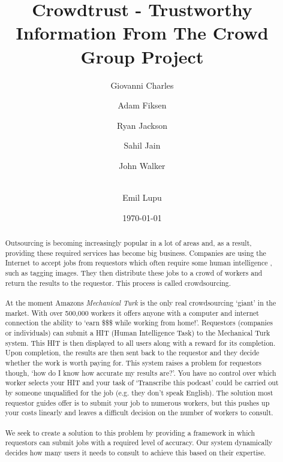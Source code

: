 \documentclass[11pt]{article}
\begin{document}
\title{Crowdtrust - Trustworthy Information From The Crowd\\ Group Project }

\author{Giovanni Charles \and Adam Fiksen \and Ryan Jackson \and Sahil Jain \and John Walker \and \\ Emil Lupu}

\date{\today}         %

\maketitle           %
\newpage


\begin{abstract}
\noindent Outsourcing is becoming increasingly popular in a lot of areas and, as a result, providing these required services has 
become big business. Companies are using the Internet to accept jobs from requestors which often require some human intelligence ,
such as tagging images. They then distribute these jobs to a crowd of workers and return the results to the requestor. This process is called
crowdsourcing. %
\\
\\
\noindent At the moment Amazons \emph{Mechanical Turk} is the only real crowdsourcing `giant' in the market. With over 500,000 workers it offers
anyone with a computer and internet connection the ability to `earn \$\$\$ while working from home!'. Requestors (companies or individuals) 
can submit a HIT (Human Intelligence Task) to the Mechanical Turk system. This HIT is then displayed to all users along with a 
reward for its completion. Upon completion, the results are then sent back to the requestor and they decide whether the work is worth paying for. 
This system raises a problem for requestors though, `how do I know how accurate my results are?'. You have no control over which worker selects your HIT and
your task of `Transcribe this podcast' could be carried out by someone unqualified for the job (e.g. they don't speak English). The solution
most requestor guides offer is to submit your job to numerous workers, but this pushes up your costs linearly and leaves a difficult
decision on the number of workers to consult.
\\
\\
We seek to create a solution to this problem by providing a framework in which requestors can submit jobs with a required level of accuracy. Our
system dynamically decides how many users it needs to consult to achieve this based on their expertise. 
  
\end{abstract}
\end{document}
